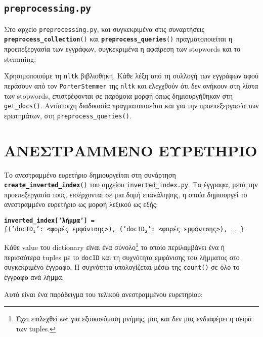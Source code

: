 ﻿\documentclass[12pt]{report}
\begin{document}
            \subsection{\tt preprocessing.py}

                Στο αρχείο \texttt{preprocessing.py}, και συγκεκριμένα στις συναρτήσεις \texttt{\textbf{preprocess\_collection}()} και \texttt{\textbf{preprocess\_queries}()}
                πραγματοποιείται η προεπεξεργασία των εγγράφων, συγκεκριμένα η αφαίρεση των stopwords και το stemming.

                Χρησιμοποιούμε τη \texttt{nltk} βιβλιοθήκη. Κάθε λέξη από τη συλλογή των εγγράφων αφού περάσουν από τον \texttt{PorterStemmer} της \texttt{nltk}
                και ελεγχθούν ότι δεν ανήκουν στη λίστα των stopwords, επιστρέφονται σε παρόμοια μορφή όπως δημιουργήθηκαν στη \verb|get_docs()|.
                Αντίστοιχη διαδικασία πραγματοποιείται και για την προεπεξεργασία των ερωτημάτων, στη \verb|preprocess_queries()|.

        \section{ΑΝΕΣΤΡΑΜΜΕΝΟ ΕΥΡΕΤΗΡΙΟ}

            Το ανεστραμμένο ευρετήριο δημιουργείται στη συνάρτηση \texttt{\textbf{create\_inverted\_index}()} του αρχείου \verb|inverted_index.py|.
            Τα έγγραφα, μετά την προεπεξεργασία τους, εισέρχονται σε μια δομή επανάληψης, \linebreak η οποία δημιουργεί το ανεστραμμένο ευρετήριο ως μορφή λεξικού ως εξής:

                \begin{graycomment} \centering
                    \texttt{\small \textbf{inverted\_index['λήμμα']} = \\ \{('docID\(_\texttt{1}\)': <φορές εμφάνισης>), ('docID\(_\texttt{2}\)': <φορές εμφάνισης>), \(\ldots\) \}}
                \end{graycomment}

            Κάθε value του dictionary είναι ένα σύνολο\footnote{Έχει επιλεχθεί set για εξοικονόμιση μνήμης, μας και δεν μας ενδιαφέρει η σειρά των tuples.} το οποίο περιλαμβάνει ένα ή περισσότερα tuples με το \texttt{docID}
            και τη συχνότητα εμφάνισης του λήμματος στο συγκεκριμένο έγγραφο. Η συχνότητα υπολογίζεται μέσω της \texttt{count()} σε όλο το έγγραφο ανά λήμμα.

            Αυτό είναι ένα παράδειγμα του τελικού ανεστραμμένου ευρετηρίου:
\end{document}
